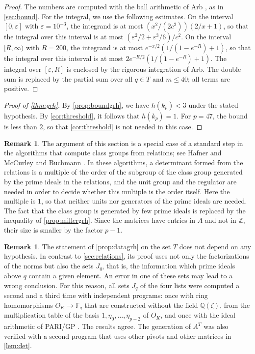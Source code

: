 \documentclass[11pt]{amsart}
\theoremstyle{plain}
\theoremstyle{definition}
\newtheorem{remark}[theorem]{Remark}
\begin{document}
\begin{proof}
The numbers are computed with the ball arithmetic of Arb \cite{Jo17, Jo18}, as in \cref{sec:bound}.
For the integral, we use the following estimates.
On the interval $[0, \varepsilon]$ with $\varepsilon = 10^{-3}$, the integrand is at most $(x^2/(2c^2))(2/x + 1)$, so that the integral over this interval is at most $(\varepsilon^2/2 + \varepsilon^3/6)/c^2$.
On the interval $[R, \infty)$ with $R = 200$, the integrand is at most $e^{-x/2}(1/(1 - e^{-R}) + 1)$, so that the integral over this interval is at most $2e^{-R/2}(1/(1 - e^{-R}) + 1)$.
The integral over $[\varepsilon, R]$ is enclosed by the rigorous integration of Arb.
The double sum is replaced by the partial sum over all $q \in T$ and $m \le 40$; all terms are positive.
\end{proof}

\begin{proof}[Proof of \cref{thm:grh}]
By \cref{prop:boundgrh}, we have $h(k_p) < 3$ under the stated hypothesis.
By \cref{cor:threshold}, it follows that $h(k_p) = 1$.
For $p = 47$, the bound is less than $2$, so that \cref{cor:threshold} is not needed in this case.
\end{proof}

\begin{remark} \label{rem:standard}
The argument of this section is a special case of a standard step in the algorithms that compute class groups from relations; see Hafner and McCurley \cite{HM89} and Buchmann \cite{Bu90}.
In these algorithms, a determinant formed from the relations is a multiple of the order of the subgroup of the class group generated by the prime ideals in the relations, and the unit group and the regulator are needed in order to decide whether this multiple is the order itself.
Here the multiple is $1$, so that neither units nor generators of the prime ideals are needed.
The fact that the class group is generated by few prime ideals is replaced by the inequality of \cref{prop:millergrh}.
Since the matrices have entries in $A$ and not in $\mathbb{Z}$, their size is smaller by the factor $p - 1$.
\end{remark}

\begin{remark} \label{rem:entries}
The statement of \cref{prop:datagrh} on the set $T$ does not depend on any hypothesis.
In contrast to \cref{sec:relations}, its proof uses not only the factorizations of the norms but also the sets $J_q$, that is, the information which prime ideals above $q$ contain a given element.
An error in one of these sets may lead to a wrong conclusion.
For this reason, all sets $J_q$ of the four lists were computed a second and a third time with independent programs: once with ring homomorphisms $O_K \to \mathbb{F}_q$ that are constructed without the field $\mathbb{Q}(\zeta)$, from the multiplication table of the basis $1, \eta_0, \dots, \eta_{p-2}$ of $O_K$, and once with the ideal arithmetic of PARI/GP \cite{PARI}.
The results agree.
The generation of $A^T$ was also verified with a second program that uses other pivots and other matrices in \cref{lem:det}.
\end{remark}
\end{document}
